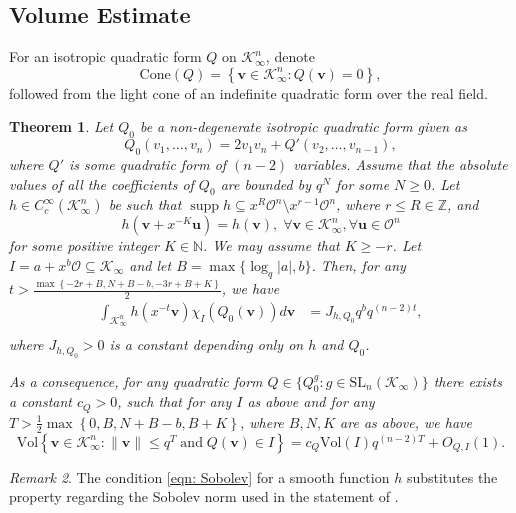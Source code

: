 \documentclass[11pt,a4paper,reqno]{amsart}
\def\vol{\mathrm{Vol}}
\newcommand{\SL}{\mathrm{SL}}
\newcommand{\Cone}{\mathrm{Cone}}
\newtheorem{theorem}{Theorem}[section]
\theoremstyle{definition}
\theoremstyle{remark}
\newtheorem{remark}[theorem]{Remark}
\numberwithin{equation}{section}
\DeclareMathOperator{\supp}{supp}
\begin{document}
\subsection{Volume Estimate}
\label{subsec:Vol}
For an isotropic quadratic form $Q$ on $\mathcal K_\infty^n$, denote
\begin{equation*}
\Cone(Q)=\left\{\mathbf v\in \mathcal K_\infty^n: Q(\mathbf v)=0 \right\},
\end{equation*}
followed from the light cone of an indefinite quadratic form over the real field.
\begin{theorem}\label{volume estimate}
Let $Q_0$ be a non-degenerate isotropic quadratic form given as
\begin{equation}\label{standard quadratic form}
Q_0(v_1, \ldots, v_n)=2v_1v_n+Q'(v_2, \ldots, v_{n-1}),
\end{equation}
where $Q'$ is some quadratic form of $(n-2)$ variables. Assume that the absolute values of all the coefficients of $Q_0$ are bounded by $q^N$ for some $N\ge 0$.
Let $h\in C_c^{\infty}(\mathcal K_\infty^n)$ be such that $\supp h \subseteq x^{R}\mathcal O^n\setminus x^{r-1}\mathcal O^n$, where $r\le R\in \mathbb Z$, and
\begin{equation}\label{eqn: Sobolev}
h(\mathbf v + x^{-K}\mathbf{u})=h(\mathbf v), \;\forall \mathbf v\in \mathcal K_\infty^n,\forall \mathbf{u}\in \mathcal{O}^n
\end{equation}
for some positive integer $K\in \mathbb N$. We may assume that $K\ge -r$.
Let $I=a+x^b\mathcal O\subseteq \mathcal K_\infty$ and let $B=\max\{\log_q|a|, b\}$. Then, for any $t> \frac{\max\left\{-2r+B,N+B-b,-3r+B+K\right\}} 2$, we have
\begin{equation}\begin{split}
\label{eqn:smoothVolEst}
\int_{\mathcal K_\infty^n} h(x^{-t}\mathbf v) \chi^{}_{I}(Q_0(\mathbf v)) d\mathbf v
&=J_{h,Q_0}q^{b}q^{(n-2)t},\\
\end{split}\end{equation}
where $J_{h,Q_0}>0$ is a constant depending only on $h$ and $Q_0$.

As a consequence, for any quadratic form $Q\in \{Q_0^g: g\in \SL_n(\mathcal K_\infty)\}$ there exists a constant $c_Q>0$, such that for any $I$ as above and for any $T>\frac{1}{2}\max\left\{0,B,N+B-b,B+K\right\}$, where $B,N,K$ are as above, we have
\begin{equation}
\label{eqn:VolEst}
\vol\left\{\mathbf v \in \mathcal K_\infty^n: \|\mathbf v \|\leq q^T\;\text{and}\; Q(\mathbf v)\in I\right\}
=c_Q \vol(I)q^{(n-2)T}+O_{Q,I}\left(1\right).
\end{equation}
\end{theorem}
\begin{remark}
The condition \eqref{eqn: Sobolev} for a smooth function $h$ substitutes the property regarding the Sobolev norm used in the statement of \cite[Lemma 3.1]{KY}. 
\end{remark}
\end{document}
